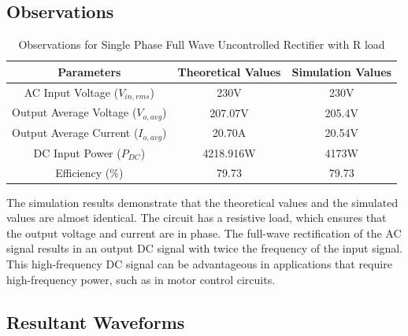 \subsection{Observations}

\begin{table}[h]
    \renewcommand{\arraystretch}{1.3}
    \label{table_observation_circuit_1}
    \centering
    \begin{tabular}{|c|c|c|}
        \hline
        Parameters                              & Theoretical Values & Simulation Values \\
        \hline
        \hline
        AC Input Voltage ($ V_{in,rms} $)       & 230V               & 230V              \\
        \hline
        Output Average Voltage ($ V_{o,avg} $)  & 207.07V            & 205.4V            \\
        \hline
        Output Average Current ($ I_{o,avg}  $) & 20.70A             & 20.54V            \\
        \hline
        DC Input Power ($ P_{DC}  $)            & 4218.916W          & 4173W             \\
        \hline
        Efficiency (\%)                         & 79.73              & 79.73             \\
        \hline
    \end{tabular}
    \caption{Observations for Single Phase Full Wave Uncontrolled Rectifier with R load}

\end{table}


The simulation results demonstrate that the theoretical values and the simulated values are almost identical. The circuit has a resistive load, which ensures that the output voltage and current are in phase. The full-wave rectification of the AC signal results in an output DC signal with twice the frequency of the input signal. This high-frequency DC signal can be advantageous in applications that require high-frequency power, such as in motor control circuits.
\pagebreak

\subsection{Resultant Waveforms}

